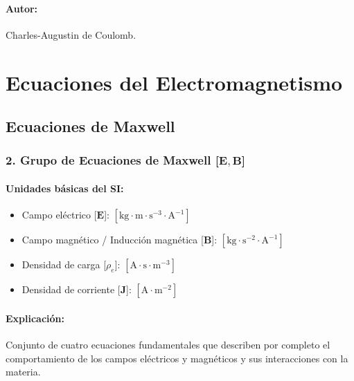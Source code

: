 \documentclass[12pt,a4paper]{article}
\begin{document}
\paragraph*{Autor:} Charles-Augustin de Coulomb.

\section{Ecuaciones del Electromagnetismo}

\subsection{Ecuaciones de Maxwell}

\subsubsection*{2. Grupo de Ecuaciones de Maxwell [$\mathbf{E}, \mathbf{B}$]}
\paragraph*{Unidades básicas del SI:}
\begin{itemize}
    \item Campo eléctrico [$\mathbf{E}$]: $[\text{kg}\cdot\text{m}\cdot\text{s}^{-3}\cdot\text{A}^{-1}]$
    \item Campo magnético / Inducción magnética [$\mathbf{B}$]: $[\text{kg}\cdot\text{s}^{-2}\cdot\text{A}^{-1}]$
    \item Densidad de carga [$\rho_e$]: $[\text{A}\cdot\text{s}\cdot\text{m}^{-3}]$
    \item Densidad de corriente [$\mathbf{J}$]: $[\text{A}\cdot\text{m}^{-2}]$
\end{itemize}
\paragraph*{Explicación:} Conjunto de cuatro ecuaciones fundamentales que describen por completo el comportamiento de los campos eléctricos y magnéticos y sus interacciones con la materia.
\end{document}
